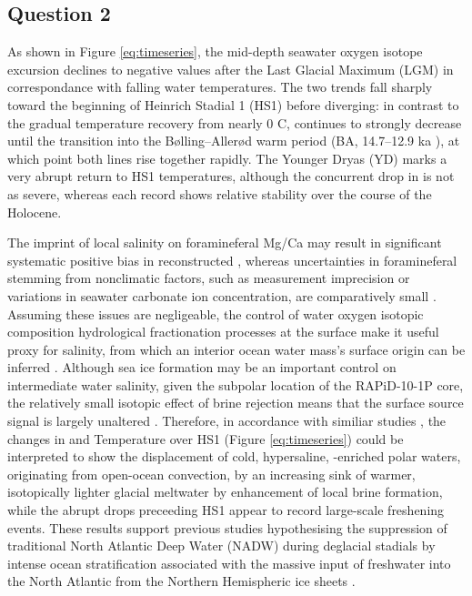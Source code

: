 \subsection{Question 2}
As shown in Figure \ref{eq:timeseries}, the mid-depth seawater oxygen isotope excursion  declines to negative values after the Last Glacial Maximum (LGM) in correspondance with falling water temperatures.
The two trends fall sharply toward the beginning of Heinrich Stadial 1 (HS1) before diverging: in contrast to the gradual temperature recovery from nearly 0 \degree{}C,  continues to strongly decrease until the transition into the Bølling–Allerød warm period (BA, 14.7–12.9 ka \parencite{thornalley2011reconstructing}), at which point both lines rise together rapidly.
The Younger Dryas (YD) marks a very abrupt return to HS1 temperatures, although the concurrent drop in  is not as severe, whereas each record shows relative stability over the course of the Holocene.

The imprint of local salinity on foramineferal Mg/Ca may result in significant systematic positive bias in reconstructed  \parencite{mathien2009salinity}, whereas uncertainties in foramineferal  stemming from nonclimatic factors, such as measurement imprecision or variations in seawater carbonate ion concentration, are comparatively small \parencite{bell2014local}. 
Assuming these issues are negligeable, the control of water oxygen isotopic composition hydrological fractionation processes at the surface make it useful proxy for salinity, from which an interior ocean water mass's surface origin can be inferred \parencite{ravelo2007use, lynch2014tracers}.
Although sea ice formation may be an important control on intermediate water salinity, given the subpolar location of the RAPiD-10-1P core, the relatively small isotopic effect of brine rejection means that the surface source  signal is largely unaltered \parencite{waelbroeck2011timing}. 
Therefore, in accordance with similiar studies \parencite[e.g.][]{thornalley2010intermediate, thornalley2011reconstructing}, the changes in  and Temperature over HS1 (Figure \ref{eq:timeseries}) could be interpreted to show the displacement of cold, hypersaline, \delO{}-enriched polar waters, originating from open-ocean convection, by an increasing sink of warmer, isotopically lighter glacial meltwater by enhancement of local brine formation, while the abrupt drops preceeding HS1 appear to record large-scale freshening events.
These results support previous studies hypothesising the suppression of traditional North Atlantic Deep Water (NADW) during deglacial stadials by intense ocean stratification associated with the massive input of freshwater into the North Atlantic from the Northern Hemispheric ice sheets \parencite{vidal1998benthic, dokken1999rapid}.

